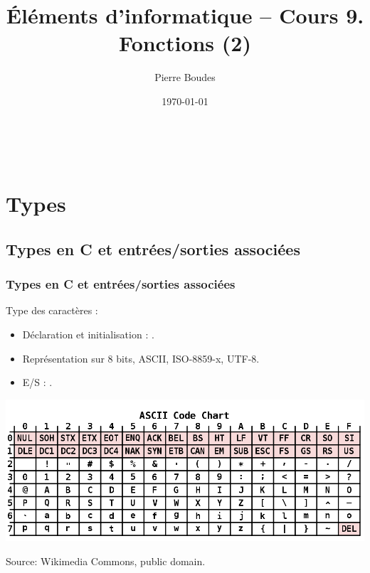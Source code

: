\documentclass[xcolor=pdftex,svgnames,table]{beamer}
\title{Éléments d'informatique -- Cours 9.\\ Fonctions (2)}
\author{Pierre Boudes}
\date{\today}
\begin{document}
\begin{frame}
	\titlepage
	\vfill
	\begin{center}
		\\[2.5ex]
		{\tiny\CcNote{\CcLongnameByNcSa}}
		\vspace*{-2.5ex}
	\end{center}
\end{frame}

\section[Plan]{}
\frame[label=plan]{\tableofcontents}
\section{Types}
\subsection{Types en C et entrées/sorties associées}

\begin{frame}
  \frametitle{Types en C et entrées/sorties associées}  
Type des caractères \alert{} :
    \begin{itemize}
    \item Déclaration et initialisation : .
    \item Représentation sur 8 bits, ASCII, ISO-8859-x, UTF-8.
    \item E/S : \alert{}.
    \end{itemize}

\includegraphics[scale=0.31]{img/1000px-ASCII_Code_Chart.png}

\vspace{-0.3cm}
{\scriptsize\hfill  Source: Wikimedia Commons, public domain.}
\end{frame}
\end{document}
